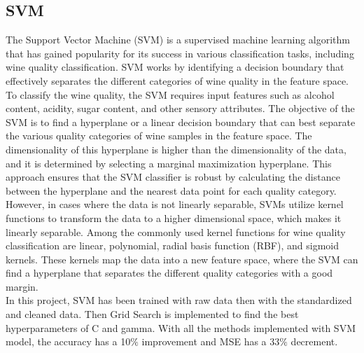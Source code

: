 \documentclass[conference]{IEEEtran}
\begin{document}
\subsection{SVM}
The Support Vector Machine (SVM) is a supervised machine learning algorithm that has gained popularity for its success in various classification tasks, including wine quality classification. SVM works by identifying a decision boundary that effectively separates the different categories of wine quality in the feature space.\\

To classify the wine quality, the SVM requires input features such as alcohol content, acidity, sugar content, and other sensory attributes. The objective of the SVM is to find a hyperplane or a linear decision boundary that can best separate the various quality categories of wine samples in the feature space. The dimensionality of this hyperplane is higher than the dimensionality of the data, and it is determined by selecting a marginal maximization hyperplane. This approach ensures that the SVM classifier is robust by calculating the distance between the hyperplane and the nearest data point for each quality category.\\

However, in cases where the data is not linearly separable, SVMs utilize kernel functions to transform the data to a higher dimensional space, which makes it linearly separable. Among the commonly used kernel functions for wine quality classification are linear, polynomial, radial basis function (RBF), and sigmoid kernels. These kernels map the data into a new feature space, where the SVM can find a hyperplane that separates the different quality categories with a good margin.\\

In this project, SVM has been trained with raw data then with the standardized and cleaned data. Then Grid Search is implemented to find the best hyperparameters of C and gamma. With all the methods implemented with SVM model, the accuracy has a 10$\%$ improvement and MSE has a 33$\%$ decrement. 
\end{document}
